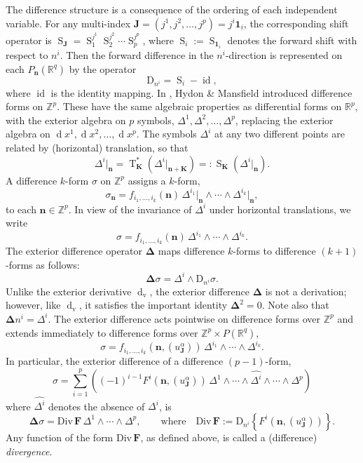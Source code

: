 \documentclass[11pt]{article} %
\numberwithin{equation}{section}
\newcommand{\es}{\operatorname{S}}
\newcommand{\te}{\operatorname{T}}
\newcommand{\id}{\operatorname{id}}
\newcommand{\upd}{\operatorname{d}}
\newcommand{\upv}{\operatorname{v}}
\newcommand{\dv}{\upd_{\upv}\!}
\newcommand{\diffi}{\mathrm{D}_{n^i}}
\newcommand{\mbn}{\mathbf{n}}
\newcommand{\mbJ}{\mathbf{J}}
\newcommand{\mbK}{\mathbf{K}}
\newcommand{\bD}{\bm{\Delta}}
\theoremstyle{plain}
\theoremstyle{definition}
\begin{document}
The difference structure is a consequence of the ordering of each independent variable. For any multi-index $\mbJ=(j^1,j^2,\dots,j^p)=j^i\mathbf{1}_i$, the corresponding shift operator is
$\es_{\mbJ}=\es_{1}^{j^1}\es_{2}^{j^2}\cdots \es_{p}^{j^p}$, where $\es_i:=\es_{\mathbf{1}_i}$ denotes the forward shift with respect to $n^i$. Then the forward difference in the $n^i$-direction is represented on each $P_{\mbn}(\mathbb{R}^q)$ by the operator
\begin{equation}\label{symdiffi}
\diffi=\es_i-\id,
\end{equation}
where $\id$ is the identity mapping. In \cite{HyMa2004}, Hydon \& Mansfield introduced difference forms on $\mathbb{Z}^p$. These have the same algebraic properties as differential forms on $\mathbb{R}^p$, with the exterior algebra on $p$ symbols, $\Delta^1,\Delta^2,\dots,\Delta^p$, replacing the exterior algebra on $\upd\! x^1,\upd\! x^2,\dots,\upd\! x^p$. The symbols $\Delta^i$ at any two different points are related by (horizontal) translation, so that
\begin{equation}\label{sdel}
\Delta^i\big|_\mbn=\te_{\mbK}^*(\Delta^i\big|_{\mbn+\mbK})=:\es_\mbK(\Delta^i\big|_{\mbn}).
\end{equation}
A difference $k$-form $\sigma$ on $\mathbb{Z}^p$ assigns a $k$-form,
\[
\sigma_\mbn=f_{i_1,\ldots,i_k}(\mbn)\,
\Delta^{i_1}\big|_\mbn\wedge\cdots\wedge\Delta^{i_k}\big|_\mbn,
\]
to each $\mbn\in\mathbb{Z}^p$. In view of the invariance of $\Delta^i$ under horizontal translations, we write
\begin{equation}
\sigma=f_{i_1,\ldots,i_k}(\mbn)\,
\Delta^{i_1}\wedge\cdots\wedge\Delta^{i_k}.
\end{equation}
The exterior difference operator $\bD$ maps difference $k$-forms to difference $(k+1)$-forms as follows:
\begin{equation}
\bD\sigma=\Delta^i\wedge \diffi\sigma.
\end{equation}
Unlike the exterior derivative $\dv $, the exterior difference $\bD$ is not a derivation; however, like $\dv $, it satisfies the important identity $\bD^2=0$. Note also that $\bD n^i=\Delta^i$. The exterior difference acts pointwise on difference forms over $\mathbb{Z}^p$ and extends immediately to difference forms over $\mathbb{Z}^p\times P(\mathbb{R}^q)$,
\[
\sigma=f_{i_1,\ldots,i_k}(\mbn,(u^{\alpha}_{\mbJ}))\,
\Delta^{i_1}\wedge\cdots\wedge\Delta^{i_k}.
\]
In particular, the exterior difference of a difference $(p-1)$-form,
\[
\sigma=\sum_{i=1}^p \left((-1)^{i-1}F^i(\mbn,(u^{\alpha}_{\mbJ}))\,
\Delta^{1}\wedge\cdots\wedge\widehat{\Delta^{i}}\wedge\cdots\wedge\Delta^{p}\right)
\]
where $\widehat{\Delta^i}$ denotes the absence of $\Delta^i$, is
\[
\bD\sigma=\text{Div}\,\mathbf{F}\,\Delta^{1}\wedge\cdots\wedge\Delta^{p},\qquad\text{where}\quad \text{Div}\,\mathbf{F}:=\diffi\!\left\{ F^i(\mbn,(u^{\alpha}_{\mbJ}))\right\}.
\]
Any function of the form $\text{Div}\,\mathbf{F}$, as defined above, is called a (difference) \textit{divergence}.
\end{document}
